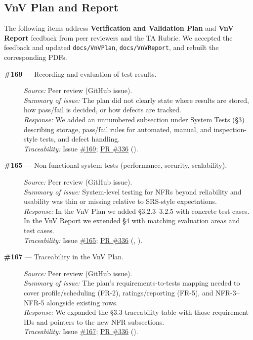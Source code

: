 \documentclass{article}
\begin{document}
\subsection{VnV Plan and Report}

The following items address \textbf{Verification and Validation Plan} and \textbf{VnV Report} feedback from peer reviewers and the TA Rubric. We accepted the feedback and updated \texttt{docs/VnVPlan}, \texttt{docs/VnVReport}, and rebuilt the corresponding PDFs.

\begin{description}
  \item[\textbf{\#169} --- Recording and evaluation of test results.]
  \textit{Source:} Peer review (GitHub issue). \\
  \textit{Summary of issue:} The plan did not clearly state where results are stored, how pass/fail is decided, or how defects are tracked. \\
  \textit{Response:} We added an unnumbered subsection under System Tests (\S3) describing storage, pass/fail rules for automated, manual, and inspection-style tests, and defect handling. \\
  \textit{Traceability:} Issue \href{https://github.com/hitchly/hitchly/issues/169}{\#169}; \href{https://github.com/hitchly/hitchly/pull/336}{PR \#336} ().

  \item[\textbf{\#165} --- Non-functional system tests (performance, security, scalability).]
  \textit{Source:} Peer review (GitHub issue). \\
  \textit{Summary of issue:} System-level testing for NFRs beyond reliability and usability was thin or missing relative to SRS-style expectations. \\
  \textit{Response:} In the VnV Plan we added \S3.2.3--3.2.5 with concrete test cases. In the VnV Report we extended \S4 with matching evaluation areas and test cases. \\
  \textit{Traceability:} Issue \href{https://github.com/hitchly/hitchly/issues/165}{\#165}; \href{https://github.com/hitchly/hitchly/pull/336}{PR \#336} (, ).

  \item[\textbf{\#167} --- Traceability in the VnV Plan.]
  \textit{Source:} Peer review (GitHub issue). \\
  \textit{Summary of issue:} The plan's requirements-to-tests mapping needed to cover profile/scheduling (FR-2), ratings/reporting (FR-5), and NFR-3--NFR-5 alongside existing rows. \\
  \textit{Response:} We expanded the \S3.3 traceability table with those requirement IDs and pointers to the new NFR subsections. \\
  \textit{Traceability:} Issue \href{https://github.com/hitchly/hitchly/issues/167}{\#167}; \href{https://github.com/hitchly/hitchly/pull/336}{PR \#336} ().


\end{description}
\end{document}
